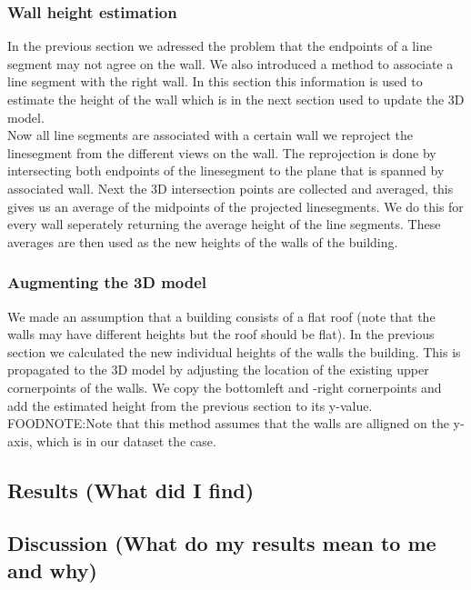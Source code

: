 \subsubsection{Wall height estimation}
	In the previous section we adressed the problem that the endpoints of a line segment may not agree on the wall.  We also introduced a method to associate a line segment with the right wall. In this section this information is used to estimate the height of the wall which is in the next section used to update the 3D model.\\
	Now all line segments are associated with a certain wall we reproject the linesegment from the different views on the wall. The reprojection is done by intersecting both endpoints of the linesegment to the plane that is spanned by associated wall.
	Next the 3D intersection points are collected and averaged, this gives us an average of the midpoints of the projected linesegments. We do this for every wall seperately returning the average height of the line segments.
	These averages are then used as the new heights of the walls of the building.

\subsubsection{Augmenting the 3D model} %
	We made an assumption that a building consists of a flat roof (note that the walls may have different heights but the roof should be flat).
	In the previous section we calculated the new individual heights of the walls the building. 
	This is propagated to the 3D model by adjusting the location of the existing upper cornerpoints of the walls. We copy the bottomleft and -right cornerpoints and add the estimated height from the previous section to its y-value.
	FOODNOTE:Note that this method assumes that the walls are alligned on the y-axis, which is in our dataset the case.


\subsection{Results (What did I find)}
\subsection{Discussion (What do my results mean to me and why)}

